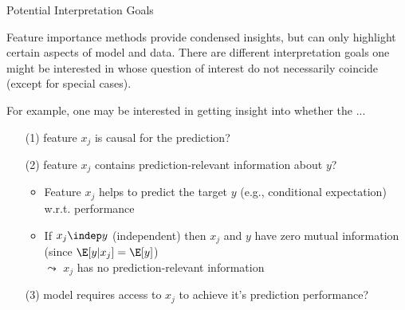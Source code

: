 \documentclass[11pt,compress,t,notes=noshow, aspectratio=169, xcolor=table]{beamer}
\begin{document}
\begin{frame}{Potential Interpretation Goals}

Feature importance methods provide condensed insights, but can only highlight certain aspects of model and data. There are different interpretation goals one might be interested in whose question of interest do not necessarily coincide (except for special cases).

\lz

For example, one may be interested in getting insight into whether the ...

\begin{enumerate}
    \item[(1)] feature $x_j$ is causal for the prediction?
    \item[(2)] feature $x_j$ contains prediction-relevant information about $y$?
    \begin{itemize}
      \item Feature $x_j$ helps to predict the target $y$ (e.g., conditional expectation) w.r.t. performance 
      \item If $x_j \indep y$ (independent) then $x_j$ and $y$ have zero mutual information (since $\E[y|x_j] = \E[y]$)\\ %
      $\leadsto$ $x_j$ has no prediction-relevant information
    \end{itemize}
    \item[(3)] model requires access to $x_j$ to achieve it's prediction performance?
\end{enumerate}
\end{frame}
\end{document}
